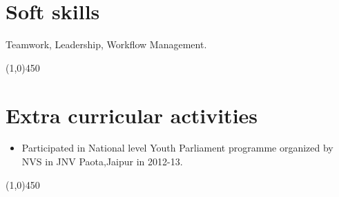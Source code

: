 \documentclass[10pt]{article}
\begin{document}
\section{Soft skills}
\hspace{1 cm} Teamwork, Leadership, Workflow Management.

\begin{center}
	\line(1,0){450}
\end{center}
\section{Extra curricular activities}
\begin{itemize}
	\item Participated in National level Youth Parliament programme organized by NVS in JNV Paota,Jaipur in 2012-13.
	
\end{itemize}
\begin{center}
	\line(1,0){450}
\end{center}
\end{document}

